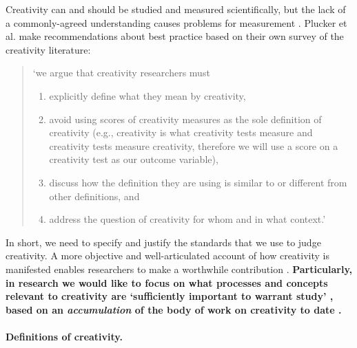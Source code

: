 \documentclass[10pt,letterpaper]{article}
\begin{document}
Creativity can and should be studied and measured scientifically, but the lack of a commonly-agreed understanding causes problems for measurement \cite{kaufman09}. Plucker et al. make recommendations about best practice based on their own survey of the creativity literature:
\begin{quote}
\noindent
`we argue that creativity researchers must

\begin{enumerate}
\renewcommand{\labelenumi}{(\alph{enumi})}
\item explicitly define what they mean by creativity,
\item avoid using scores of creativity measures as the sole definition of creativity (e.g., creativity is what creativity tests measure and creativity tests measure creativity, therefore we will use a score on a creativity test as our outcome variable),
\item discuss how the definition they are using is similar to or different from other definitions, and
\item address the question of creativity for whom and in what context.' \cite[p.92]{plucker04defn}
\end{enumerate}
\end{quote}

\noindent In short, we need to specify and justify the standards that we use to judge creativity. A more objective and well-articulated account of how creativity is manifested enables researchers to make a worthwhile contribution \cite{torrance67,plucker04defn,kaufman09}. \textbf{Particularly, in research we would like to focus on what processes and concepts relevant to creativity are `sufficiently important to warrant study' \cite[p. 15]{vartanian14}, based on an {\em accumulation} of the body of work on creativity to date \cite{vartanian14}.}

\paragraph{Definitions of creativity.}
\label{existing_defs}
\end{document}
